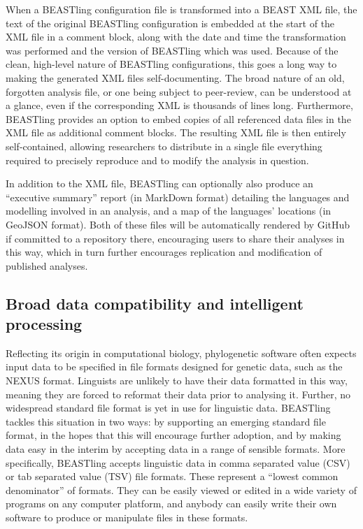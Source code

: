 \documentclass[twocolumn,10pt]{scrartcl}
\begin{document}
When a BEASTling configuration file is transformed into a BEAST XML file, the text of the original BEASTling configuration is embedded at the start of the XML file in a comment block, along with the date and time the transformation was performed and the version of BEASTling which was used.  Because of the clean, high-level nature of BEASTling configurations, this goes a long way to making the generated XML files self-documenting.  The broad nature of an old, forgotten analysis file, or one being subject to peer-review, can be understood at a glance, even if the corresponding XML is thousands of lines long.  Furthermore, BEASTling provides an option to embed copies of all referenced data files in the XML file as additional comment blocks.  The resulting XML file is then entirely self-contained, allowing researchers to distribute in a single file everything required to precisely reproduce and to modify the analysis in question.

In addition to the XML file, BEASTling can optionally also produce an ``executive summary'' report (in MarkDown format) detailing the languages and modelling involved in an analysis, and a map of the languages' locations (in GeoJSON format).  Both of these files will be automatically rendered by GitHub if committed to a repository there, encouraging users to share their analyses in this way, which in turn further encourages replication and modification of published analyses.

\subsection{Broad data compatibility and intelligent processing}

Reflecting its origin in computational biology, phylogenetic software often expects input data to be specified in file formats designed for genetic data, such as the NEXUS format\cite{Maddison1997}.  Linguists are unlikely to have their data formatted in this way, meaning they are forced to reformat their data prior to analysing it.  Further, no widespread standard file format is yet in use for linguistic data.  BEASTling tackles this situation in two ways: by supporting an emerging standard file format, in the hopes that this will encourage further adoption, and by making data easy in the interim by accepting data in a range of sensible formats.  More specifically, BEASTling accepts linguistic data in comma separated value (CSV) or tab separated value (TSV) file formats.  These represent a ``lowest common denominator'' of formats.  They can be easily viewed or edited in a wide variety of programs on any computer platform, and anybody can easily write their own software to produce or manipulate files in these formats.
\end{document}
